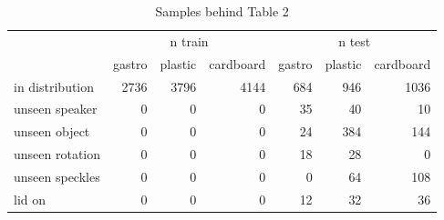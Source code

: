 \begin{table}
\caption{Samples behind Table 2}
\label{tab:ood_samples}
\begin{tabular}{lrrrrrr}
\toprule
 & \multicolumn{3}{c}{n train} & \multicolumn{3}{c}{n test} \\
 & gastro & plastic & cardboard & gastro & plastic & cardboard \\
\midrule
in distribution & 2736 & 3796 & 4144 & 684 & 946 & 1036 \\
unseen speaker & 0 & 0 & 0 & 35 & 40 & 10 \\
unseen object & 0 & 0 & 0 & 24 & 384 & 144 \\
unseen rotation & 0 & 0 & 0 & 18 & 28 & 0 \\
unseen speckles & 0 & 0 & 0 & 0 & 64 & 108 \\
lid on & 0 & 0 & 0 & 12 & 32 & 36 \\
\bottomrule
\end{tabular}
\end{table}
